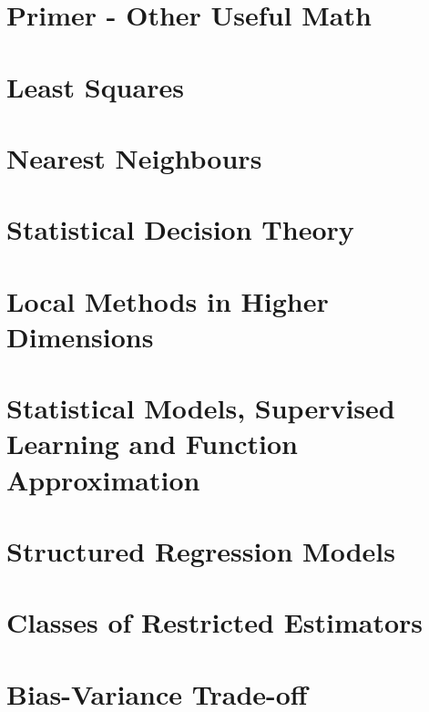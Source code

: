 \documentclass[12pt]{article}
\begin{document}
\section{Primer - Other Useful Math}

\section{Least Squares}

\section{Nearest Neighbours}

\section{Statistical Decision Theory}

\section{Local Methods in Higher Dimensions}

\section{Statistical Models, Supervised Learning and Function Approximation}
\section{Structured Regression Models}
\section{Classes of Restricted Estimators}
\section{Bias-Variance Trade-off}
\end{document}
